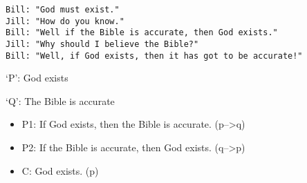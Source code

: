 \documentclass[]{article}
\begin{document}
\begin{verbatim}
Bill: "God must exist." 
Jill: "How do you know." 
Bill: "Well if the Bible is accurate, then God exists." 
Jill: "Why should I believe the Bible?" 
Bill: "Well, if God exists, then it has got to be accurate!"
\end{verbatim}

`P': God exists

`Q': The Bible is accurate

\begin{itemize}
\item
  P1: If God exists, then the Bible is accurate. (p--\textgreater{}q)
\item
  P2: If the Bible is accurate, then God exists. (q--\textgreater{}p)
\item
  C: God exists. (p)
\end{itemize}
\end{document}
